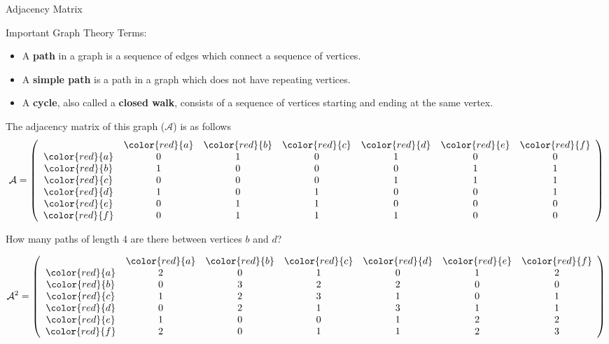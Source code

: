 

{Adjacency Matrix}

Important Graph Theory Terms:\\
\begin{itemize}
\item A \textbf{path} in a graph is a sequence of edges which connect a sequence of vertices. 

\item A \textbf{simple path} is a path in a graph which does not have repeating vertices.

\item A \textbf{cycle}, also called a \textbf{closed walk}, consists of a sequence of vertices starting and ending at the same vertex.
\end{itemize}


The adjacency matrix of this graph ($\mathcal{A}$) is as follows
\[
\mathcal{A} = 
\left( 
\begin{array}{ccccccc}
&{\color{red}{a}}&{\color{red}{b}}
&{\color{red}{c}}&{\color{red}{d}}
&{\color{red}{e}}&{\color{red}{f}}
\\
{\color{red}{a}} & 0 & 1 & 0 & 1 & 0 & 0\\
{\color{red}{b}} & 1 & 0 & 0 & 0 & 1 & 1\\
{\color{red}{c}} & 0 & 0 & 0 & 1 & 1 & 1\\
{\color{red}{d}} & 1 & 0 & 1 & 0 & 0 & 1\\
{\color{red}{e}} & 0 & 1 & 1 & 0 & 0 & 0\\
{\color{red}{f}} & 0 & 1 & 1 & 1 & 0 & 0\\
\end{array} 
\right) \]



How many paths of length 4 are there between vertices $b$ and $d$?

\[
\mathcal{A}^2 = 
\left( 
\begin{array}{ccccccc}
&{\color{red}{a}}&{\color{red}{b}}
&{\color{red}{c}}&{\color{red}{d}}
&{\color{red}{e}}&{\color{red}{f}}
\\
{\color{red}{a}} & 2 & 0 & 1& 0 & 1 & 2\\
{\color{red}{b}} & 0 & 3 & 2& 2 & 0 & 0\\
{\color{red}{c}} & 1 & 2 & 3& 1 & 0 & 1\\
{\color{red}{d}} & 0 & 2 & 1& 3 & 1 & 1\\
{\color{red}{e}} & 1 & 0 & 0& 1 & 2 & 2\\
{\color{red}{f}} & 2 & 0 & 1& 1 & 2 & 3\\
\end{array}
\right)
\]


